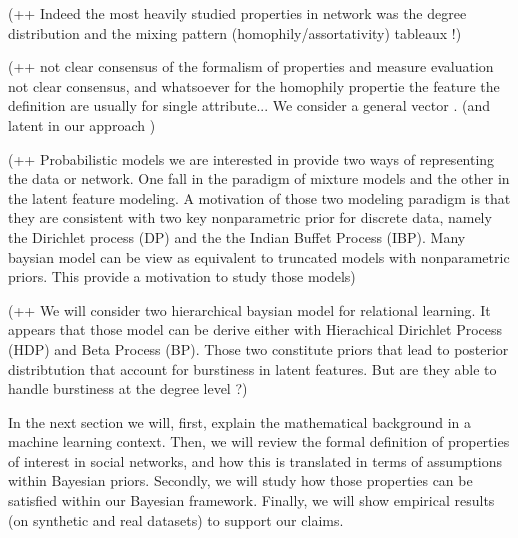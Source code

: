 \documentclass[a4paper, 12pt]{article}
\begin{document}
(++ Indeed the most heavily studied properties in network was the degree distribution and the mixing pattern (homophily/assortativity) tableaux !)

(++ not clear consensus of the formalism of properties and measure evaluation not clear consensus, and whatsoever for the homophily propertie the feature the definition are usually for single attribute... We consider a general vector . (and latent in our approach )

(++ Probabilistic models we are interested in provide two ways of representing the data or network. One fall in the paradigm of mixture models and the other in the latent feature modeling. A motivation of those two modeling paradigm is that they are consistent with two key nonparametric prior for discrete data, namely the Dirichlet process (DP) and the the Indian Buffet Process (IBP). Many baysian model can be view as equivalent to truncated models with nonparametric priors. This provide a motivation to study those models)

(++ We will consider two hierarchical baysian model for relational learning. It appears that those model can be derive either with Hierachical Dirichlet Process (HDP) and Beta Process (BP). Those two constitute priors that lead to posterior distribtution that account for burstiness in latent features. But are they able to handle burstiness at the degree level ?)


In the next section we will, first, explain the mathematical background in a machine learning context. Then, we will review the formal definition of properties of interest in social networks, and how this is translated in terms of assumptions within Bayesian priors. Secondly, we will study how those properties can be satisfied within our Bayesian framework. Finally, we will show empirical results (on synthetic and real datasets) to support our claims.~\\
\end{document}
